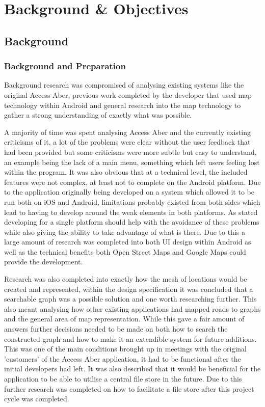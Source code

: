 \chapter{Background \& Objectives}

\section{Background}
\subsection{Background and Preparation}
Background research was compromised of analysing existing systems like the original Access Aber\cite{aa}, previous work completed by the developer that used map technology within Android and general research into the map technology to gather a strong understanding of exactly what was possible.

A majority of time was spent analysing Access Aber and the currently existing criticisms of it, a lot of the problems were clear without the user feedback that had been provided but some criticisms were more subtle but easy to understand, an example being the lack of a main menu, something which left users feeling lost within the program. It was also obvious that at a technical level, the included features were not complex, at least not to complete on the Android platform. Due to the application originally being developed on a system which allowed it to be run both on iOS and Android, limitations probably existed from both sides which lead to having to develop around the weak elements in both platforms. As stated developing for a single platform should help with the avoidance of these problems while also giving the ability to take advantage of what is there. Due to this a large amount of research was completed into both UI design within Android as well as the technical benefits both Open Street Maps\cite{osm} and Google Maps\cite{gm} could provide the development. 

Research was also completed into exactly how the mesh of locations would be created and represented\cite{pf}, within the design specification it was concluded that a searchable graph was a possible solution and one worth researching further. This also meant analysing how other existing applications had mapped roads to graphs and the general area of map representation\cite{mr}. While this gave a fair amount of answers further decisions needed to be made on both how to search the constructed graph and how to make it an extendible system for future additions. This was one of the main conditions brought up in meetings with the original 'customers' of the Access Aber application, it had to be functional after the initial developers had left. It was also described that it would be beneficial for the application to be able to utilise a central file store in the future. Due to this further research was completed on how to facilitate a file store after this project cycle was completed.


